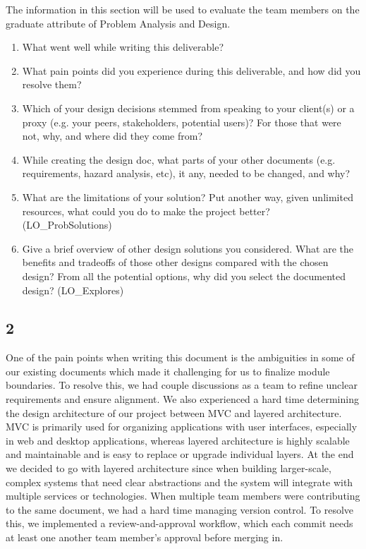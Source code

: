 \documentclass[12pt, titlepage]{article}
\begin{document}
The information in this section will be used to evaluate the team members on the
graduate attribute of Problem Analysis and Design.



\begin{enumerate}
  \item What went well while writing this deliverable? 
  \item What pain points did you experience during this deliverable, and how
    did you resolve them?
  \item Which of your design decisions stemmed from speaking to your client(s)
  or a proxy (e.g. your peers, stakeholders, potential users)? For those that
  were not, why, and where did they come from?
  \item While creating the design doc, what parts of your other documents (e.g.
  requirements, hazard analysis, etc), it any, needed to be changed, and why?
  \item What are the limitations of your solution?  Put another way, given
  unlimited resources, what could you do to make the project better? (LO\_ProbSolutions)
  \item Give a brief overview of other design solutions you considered.  What
  are the benefits and tradeoffs of those other designs compared with the chosen
  design?  From all the potential options, why did you select the documented design?
  (LO\_Explores)
\end{enumerate}

\subsection{2}
One of the pain points when writing this document is the ambiguities in some of our existing documents which made it challenging for us to finalize module boundaries. To resolve this, we had couple discussions as a team to refine unclear requirements and ensure alignment. We also experienced a hard time determining the design architecture of our project between MVC and layered architecture. MVC is primarily used for organizing applications with user interfaces, especially in web and desktop applications, whereas layered architecture is highly scalable and maintainable and is easy to replace or upgrade individual layers. At the end we decided to go with layered architecture since when building larger-scale, complex systems that need clear abstractions and the system will integrate with multiple services or technologies. When multiple team members were contributing to the same document, we had a hard time managing version control. To resolve this, we implemented a review-and-approval workflow, which each commit needs at least one another team member’s approval before merging in.
\end{document}
